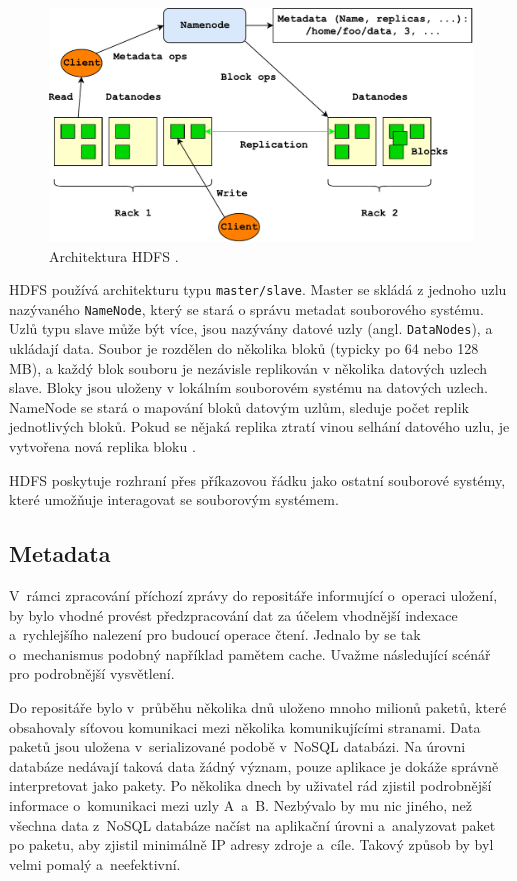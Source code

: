 \begin{figure}[!h]
  \centering
  \includegraphics[width=15cm]{template-fig/HDFSArchitecture.pdf}
  \caption{Architektura HDFS \cite{apacheHDFSGuide}.}
  \label{FIG_SystemArchitecture}
\end{figure}

\noindent HDFS používá architekturu typu \texttt{master/slave}. Master se skládá z jednoho uzlu nazývaného \texttt{NameNode}, který se stará o správu metadat souborového systému. Uzlů typu slave může být více, jsou nazývány datové uzly (angl. \texttt{DataNodes}), a ukládají data. Soubor je rozdělen do několika bloků (typicky po 64 nebo 128 MB), a každý blok souboru je nezávisle replikován v několika datových uzlech slave. Bloky jsou uloženy v lokálním souborovém systému na datových uzlech. NameNode se stará o mapování bloků datovým uzlům, sleduje počet replik jednotlivých bloků. Pokud se nějaká replika ztratí vinou selhání datového uzlu, je vytvořena nová replika bloku \cite{hadoopHortonworks}. 

HDFS poskytuje rozhraní přes příkazovou řádku jako ostatní souborové systémy, které umožňuje interagovat se souborovým systémem.

\subsection{Metadata} \label{metadata}
V~rámci zpracování příchozí zprávy do repositáře informující o~operaci uložení, by bylo vhodné provést předzpracování dat za účelem vhodnější indexace a~rychlejšího nalezení pro budoucí operace čtení. Jednalo by se tak o~mechanismus podobný například pamětem cache. Uvažme následující scénář pro podrobnější vysvětlení.

Do repositáře bylo v~průběhu několika dnů uloženo mnoho milionů paketů, které obsahovaly síťovou komunikaci mezi několika komunikujícími stranami. Data paketů jsou uložena v~serializované podobě v~NoSQL databázi. Na úrovni databáze nedávají taková data žádný význam, pouze aplikace je dokáže správně interpretovat jako pakety. Po několika dnech by uživatel rád zjistil podrobnější informace o~komunikaci mezi uzly A~a~B. Nezbývalo by mu nic jiného, než všechna data z~NoSQL databáze načíst na aplikační úrovni a~analyzovat paket po paketu, aby zjistil minimálně IP adresy zdroje a~cíle. Takový způsob by byl velmi pomalý a~neefektivní.


